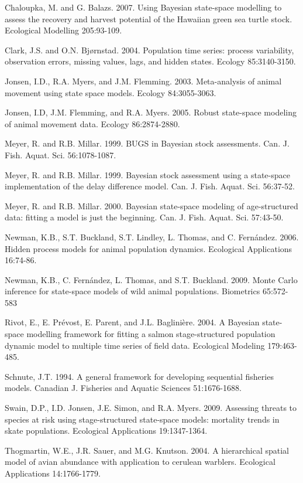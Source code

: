 Chaloupka, M. and G. Balazs.  2007.  Using Bayesian state-space modelling to assess the recovery and harvest potential of the Hawaiian green sea turtle stock. Ecological Modelling 205:93-109.

Clark, J.S. and O.N. Bj{\o}rnstad. 2004. Population time series: process variability, observation errors, missing values, lags, and hidden states. Ecology 85:3140-3150.

Jonsen, I.D., R.A. Myers, and J.M. Flemming. 2003. Meta-analysis of animal movement using state space models. Ecology 84:3055-3063.

Jonsen, I.D, J.M. Flemming, and R.A. Myers. 2005. Robust state-space modeling of animal movement data. Ecology 86:2874-2880.

Meyer, R. and R.B. Millar. 1999. BUGS in Bayesian stock assessments. Can. J. Fish. Aquat. Sci. 56:1078-1087.

Meyer, R. and R.B. Millar. 1999. Bayesian stock assessment using a state-space implementation of the delay difference model. Can. J. Fish. Aquat. Sci. 56:37-52.

Meyer, R. and R.B. Millar. 2000. Bayesian state-space modeling of age-structured data: fitting a model is just the beginning. Can. J. Fish. Aquat. Sci. 57:43-50.

Newman, K.B., S.T. Buckland, S.T. Lindley, L. Thomas, and C. Fern{\'a}ndez. 2006. Hidden process models for animal population dynamics. Ecological Applications 16:74-86.

Newman, K.B., C. Fern{\'a}ndez, L. Thomas, and S.T. Buckland. 2009.  Monte Carlo inference for state-space models of wild animal populations. Biometrics 65:572-583

Rivot, E., E. Pr{\'e}vost, E. Parent, and J.L. Baglini{\`e}re. 2004.  A Bayesian state-space modelling framework for fitting a salmon stage-structured population dynamic model to multiple time series of field data. Ecological Modeling 179:463-485.

Schnute, J.T. 1994. A general framework for developing sequential fisheries models. Canadian J. Fisheries and Aquatic Sciences 51:1676-1688.

Swain, D.P., I.D. Jonsen, J.E. Simon, and R.A. Myers. 2009. Assessing threats to species at risk using stage-structured state-space models: mortality trends in skate populations.  Ecological Applications 19:1347-1364.

Thogmartin, W.E., J.R. Sauer, and M.G. Knutson. 2004. A hierarchical spatial model of avian abundance with application to cerulean warblers. Ecological Applications 14:1766-1779.

